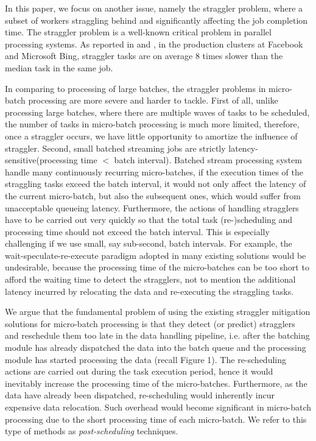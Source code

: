 \documentclass[10pt,conference,compsocconf,letterpaper]{IEEEtran}
\begin{document}
  In this paper, we focus on another issue, namely the straggler problem, where a subset of workers straggling behind and significantly affecting the job completion time. The straggler problem is a well-known critical problem in parallel processing systems. As reported in \cite{Ananthanarayanan2013} and \cite{Yadwadkar2014}, in the production clusters at Facebook and Microsoft Bing, straggler tasks are on average 8 times slower than the median task in the same job.

  In comparing to processing of large batches, the straggler problems in micro-batch processing are more severe and harder to tackle. First of all, unlike processing large batches, where there are multiple waves of tasks to be scheduled, the number of tasks in micro-batch processing is much more limited, therefore, once a straggler occurs, we have little opportunity to amortize the influence of straggler. Second, small batched streaming jobs are strictly latency-sensitive(processing time $<$ batch interval). Batched stream processing system handle many continuously recurring micro-batches, if the execution times of the straggling tasks exceed the batch interval, it would not only affect the latency of the current micro-batch, but also the subsequent ones, which would suffer from unacceptable queueing latency. Furthermore, the actions of handling stragglers have to be carried out very quickly so that the total task (re-)scheduling and processing time should not exceed the batch interval. This is especially challenging if we use small, say sub-second, batch intervals. For example, the wait-speculate-re-execute paradigm adopted in many existing solutions \cite{Dean2004} \cite{Zaharia2008} \cite{Kwon2012} would be undesirable, because the processing time of the micro-batches can be too short to afford the waiting time to detect the stragglers, not to mention the additional latency incurred by relocating the data and re-executing the straggling tasks.

  We argue that the fundamental problem of using the existing straggler mitigation solutions for micro-batch processing is that they detect (or predict) stragglers and reschedule them too late in the data handling pipeline, i.e. after the batching module has already dispatched the data into the batch queue and the processing module has started processing the data (recall Figure 1). The re-scheduling actions are carried out during the task execution period, hence it would inevitably increase the processing time of the micro-batches. Furthermore, as the data have already been dispatched, re-scheduling would inherently incur expensive data relocation. Such overhead would become significant in micro-batch processing due to the short processing time of each micro-batch. We refer to this type of methods as \emph{post-scheduling} techniques.
\end{document}
